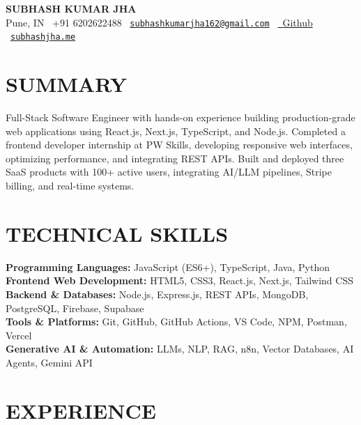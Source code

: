 \documentclass[a4paper,11pt]{article}
\begin{document}
\small

\begin{center}
    {\huge \textbf{SUBHASH KUMAR JHA}}\\[6pt]
    Pune, IN \textbar\ +91 6202622488 \textbar\
    \href{mailto:subhashkumarjha162@gmail.com}{\nolinkurl{subhashkumarjha162@gmail.com}} \textbar\
     \href{https://github.com/subhash-jhaa}{\faGithub\ {Github}} \textbar\
    \href{https://subhashjha.me}{\texttt{subhashjha.me}}
\end{center}

\section*{SUMMARY}
Full-Stack Software Engineer with hands-on experience building production-grade web applications using React.js, Next.js, TypeScript, and Node.js. Completed a frontend developer internship at PW Skills, developing responsive web interfaces, optimizing performance, and integrating REST APIs. Built and deployed three SaaS products with 100+ active users, integrating AI/LLM pipelines, Stripe billing, and real-time systems.

\section*{TECHNICAL SKILLS}
\textbf{Programming Languages:} JavaScript (ES6+), TypeScript, Java, Python\\
\textbf{Frontend Web Development:} HTML5, CSS3, React.js, Next.js, Tailwind CSS\\
\textbf{Backend \& Databases:} Node.js, Express.js, REST APIs, MongoDB, PostgreSQL, Firebase, Supabase\\
\textbf{Tools \& Platforms:} Git, GitHub, GitHub Actions, VS Code, NPM, Postman, Vercel\\
\textbf{Generative AI \& Automation:} LLMs, NLP, RAG, n8n, Vector Databases, AI Agents, Gemini API\\

\section*{EXPERIENCE}
\end{document}
